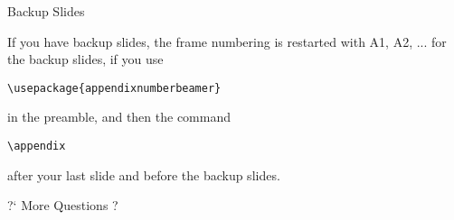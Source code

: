 \appendix
\begin{frame}[fragile]{Backup Slides}

  
  \begin{block}{}
    If you have backup slides, the frame numbering is restarted with
    A1, A2, ... for the backup slides, if you use

    
\begin{verbatim}
\usepackage{appendixnumberbeamer}
\end{verbatim}

    in the preamble, and then the command
\begin{verbatim}
\appendix
\end{verbatim}

    after your last slide and before the backup slides. 
  \end{block}

\end{frame}

\begin{frame}{}
  \centering\Huge
  ?` More Questions ?
\end{frame}
